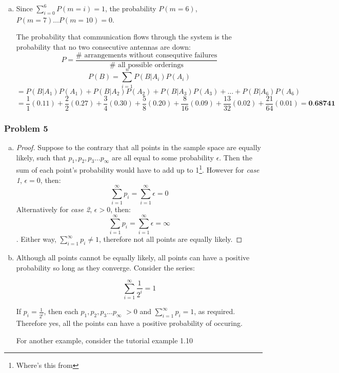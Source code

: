 \documentclass[11pt]{extarticle}
\begin{document}
\begin{enumerate}[(a)]
\begin{verbatim}
def number_with_consecutive_zeros(bits):
    nf = 0
    for l in binary_list_sequence(bits):
        if(not consecutive_zeros(l)): nf += 1
    return nf
 
for i in range(0, 20):
    print(i, "\t", 2**i, "\t", number_with_consecutive_zeros(i))
\end{verbatim}
\normalsize


\item Since $\sum_{i=0}^6 P(m=i) = 1$, the probability $P(m=6)$, $P(m=7) \dots P(m=10)=0$.

The probability that communication flows through the system is the probability that no two consecutive antennas are down: $$P = \frac{\#\text{ arrangements without consequtive failures}}{\#\text{ all possible orderings}}$$
$$ P(B) = \sum_{i=1}^{n}  P(B | A_i) P(A_i) $$ 
$$= P(B|A_1)P(A_1) +  P(B|A_2)P(A_2) +  P(B|A_3)P(A_3) + \dots +  P(B|A_{6})P(A_{6})$$ 
$$= \frac{1}{1} (0.11) + \frac{2}{2} (0.27) + \frac{3}{4}(0.30) +  \frac{5}{8} (0.20) + \frac{8}{16}  (0.09) + \frac{13}{32}  (0.02) +  \frac{21}{64} (0.01) = \textbf{0.68741}$$ 






\end{enumerate}


\subsubsection*{Problem 5}

\begin{enumerate}[(a)]

\item \begin{proof}[Proof] Suppose to the contrary that all points in the sample space are equally likely, such that $p_1, p_2, p_3 \dots p_\infty$ are all equal to some probability $\epsilon$. Then the sum of each point's probability would have to add up to 1\footnote{Where's this from}. However for \textit{case 1}, $\epsilon = 0$, then: $$ \sum_{i=1}^{\infty} p_i = \sum_{i=1}^{\infty} \epsilon = 0$$
Alternatively for \textit{case 2}, $\epsilon > 0$, then: $$ \sum_{i=1}^{\infty} p_i = \sum_{i=1}^{\infty} \epsilon = \infty$$.
Either way, $ \sum_{i=1}^{\infty} p_i \neq 1 $, therefore not all points are equally likely.
\end{proof}

\item Although all points cannot be equally likely, all points can have a positive probability so long as they converge. Consider the series:

$$ \sum_{i=1}^{\infty} \frac{1}{2^i} = 1$$

If $p_i = \frac{1}{2^i}$, then each $p_1, p_2, p_3 \dots p_{\infty}$ $ > 0 $ and $ \sum_{i=1}^{\infty} p_i = 1 $, as required. Therefore yes, all the points can have a positive probability of occuring.

For another example, consider the tutorial example 1.10

\end{enumerate}
\end{document}
